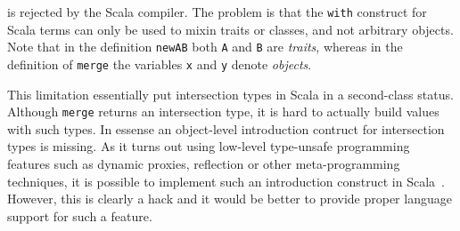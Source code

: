 \noindent is rejected by the Scala compiler. The problem is that the
\lstinline{with} construct for Scala terms can only be used to
mixin traits or classes, and not arbitrary objects. Note that in the
definition \lstinline{newAB} both \lstinline{A} and \lstinline{B} are
\emph{traits}, whereas in the definition of \lstinline{merge} the variables
\lstinline{x} and \lstinline{y} denote \emph{objects}.

\begin{comment}
A common limitation in those languages, though, is that there is no introduction
construct at the term level for intersection types. In Java and Scala, we cannot
create an instance of class type \lstinline{A & B} with
\begin{lstlisting}
  new A() & B()
\end{lstlisting}
\end{comment}

This limitation essentially put intersection types in Scala in a second-class
status. Although \lstinline{merge} returns an intersection type, it is
hard to actually build values with such types. In essense an
object-level introduction contruct for intersection types is missing.
As it turns out using low-level type-unsafe programming features such
as dynamic proxies, reflection or other meta-programming techniques,
it is possible to implement such an introduction
construct in Scala~\cite{oliveira2013feature,rendel14attributes}. However, this
is clearly a hack and it would be better to provide proper language
support for such a feature.

\begin{comment}
This is in
contrast, there are term-level introduction construct for function types (with
lambdas) and universal quantification (with big lambdas) in most core
calculi.
\end{comment}



